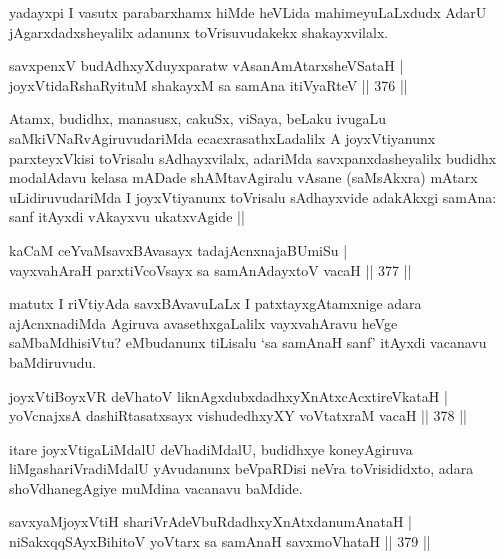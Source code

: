 \begin{artha}
yadayxpi I vasutx parabarxhamx hiMde heVLida mahimeyuLaLxdudx AdarU jAgarxdadxsheyalilx adanunx toVrisuvudakekx shakayxvilalx.
\end{artha}


\begin{shl}
savxpenxV budAdhxyXduyxparatw vAsanAmAtarxsheVSataH | \\
joyxVtidaRshaRyituM shakayxM sa samAna itiVyaRteV \hfill||  376 ||  
\end{shl}

\begin{artha}
Atamx, budidhx, manasusx, cakuSx, viSaya, beLaku ivugaLu saMkiVNaRvAgiruvudariMda ecacxrasathxLadalilx A joyxVtiyanunx parxteyxVkisi toVrisalu sAdhayxvilalx, adariMda savxpanxdasheyalilx budidhx modalAdavu kelasa mADade shAMtavAgiralu vAsane (saMsAkxra) mAtarx uLidiruvudariMda I joyxVtiyanunx toVrisalu sAdhayxvide adakAkxgi samAna: sanf itAyxdi vAkayxvu ukatxvAgide ||
\end{artha}

\begin{shl}
kaCaM ceYvaMsavxBAvasayx tadajAcnxnajaBUmiSu | \\
vayxvahAraH parxtiVcoV\s sayx sa samAnAdayxtoV vacaH \hfill||  377 ||  
\end{shl}

\begin{artha}
matutx I riVtiyAda savxBAvavuLaLx I patxtayxgAtamxnige adara ajAcnxnadiMda Agiruva avasethxgaLalilx vayxvahAravu heVge saMbaMdhisiVtu? eMbudanunx tiLisalu `sa samAnaH sanf' itAyxdi vacanavu baMdiruvudu.
\end{artha}

\begin{shl}
joyxVtiBoyxVR deVhatoV liknAgxdubxdadhxyXnAtxcAcxtireVkataH | \\
yoV\s cnajxsA dashiRtasatxsayx vishudedhxyXY voVtatxraM vacaH \hfill||  378 ||  
\end{shl}

\begin{artha}
itare joyxVtigaLiMdalU deVhadiMdalU, budidhxye koneyAgiruva liMgashariVradiMdalU yAvudanunx beVpaRDisi neVra toVrisididxto, adara shoVdhanegAgiye muMdina vacanavu baMdide.
\end{artha}

\begin{shl}
savxyaMjoyxVtiH shariVrAdeVbuRdadhxyXnAtxdanumAnataH | \\
niSakxqqSAyxBihitoV yoV\s tarx sa samAnaH savxmoVhataH \hfill||  379 ||  
\end{shl}

